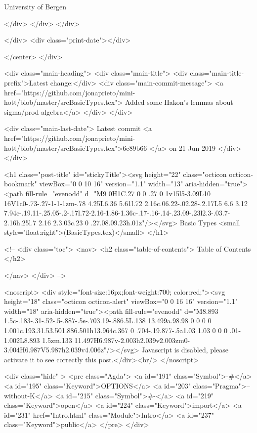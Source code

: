                   University of Bergen
                
                </div>
            </div>
          </div>
          
          
        </div>
        <div class="print-date"></div>
        
        
    </center>
  </div>

  
  <div class="main-heading">
    <div class="main-title">
      <div class="main-title-prefix">Latest change:</div>
      <div class="main-commit-message">
            <a href="https://github.com/jonaprieto/mini-hott/blob/master/srcBasicTypes.tex">
              Added some Hakon's lemmas about sigma/prod algebra</a>
      </div>
    </div>

    <div class="main-last-date">
      Latest commit <a href="https://github.com/jonaprieto/mini-hott/blob/master/srcBasicTypes.tex">6c89b66 </a> on  21 Jun 2019
    </div>
  </div>
  

  <h1 class="post-title" id="stickyTitle"><svg height="22" class="octicon octicon-bookmark" viewBox="0 0 10 16" version="1.1" width="13" aria-hidden="true"><path fill-rule="evenodd" d="M9 0H1C.27 0 0 .27 0 1v15l5-3.09L10 16V1c0-.73-.27-1-1-1zm-.78 4.25L6.36 5.61l.72 2.16c.06.22-.02.28-.2.17L5 6.6 3.12 7.94c-.19.11-.25.05-.2-.17l.72-2.16-1.86-1.36c-.17-.16-.14-.23.09-.23l2.3-.03.7-2.16h.25l.7 2.16 2.3.03c.23 0 .27.08.09.23h.01z"/></svg> Basic Types <small style="float:right">(BasicTypes.tex)</small>
  </h1>

  <!-- 
  <div class="toc">
    <nav>
    <h2 class="table-of-contents"> Table of Contents </h2>
      

    </nav>
  </div>
   -->

  <noscript>
  <div style="font-size:16px;font-weight:700; color:red;"><svg height="18" class="octicon octicon-alert" viewBox="0 0 16 16" version="1.1" width="18" aria-hidden="true"><path fill-rule="evenodd" d="M8.893 1.5c-.183-.31-.52-.5-.887-.5s-.703.19-.886.5L.138 13.499a.98.98 0 0 0 0 1.001c.193.31.53.501.886.501h13.964c.367 0 .704-.19.877-.5a1.03 1.03 0 0 0 .01-1.002L8.893 1.5zm.133 11.497H6.987v-2.003h2.039v2.003zm0-3.004H6.987V5.987h2.039v4.006z"/></svg> Javascript is disabled, please activate it to see correctly this post.</div><br/>
  </noscript>

  <div class="hide" >
<pre class="Agda">
<a id="191" class="Symbol">{-#</a> <a id="195" class="Keyword">OPTIONS</a> <a id="203" class="Pragma">--without-K</a> <a id="215" class="Symbol">#-}</a>
<a id="219" class="Keyword">open</a> <a id="224" class="Keyword">import</a> <a id="231" href="Intro.html" class="Module">Intro</a> <a id="237" class="Keyword">public</a>
</pre>
</div>

